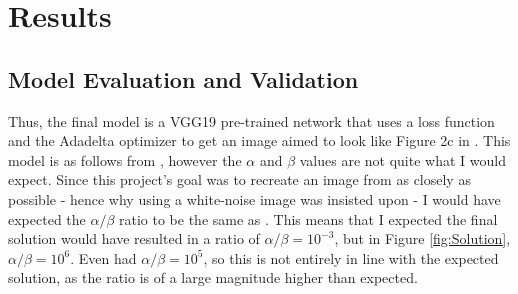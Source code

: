 \documentclass[12pt]{article}
\begin{document}
\section{Results}
\subsection{Model Evaluation and Validation}
Thus, the final model is a VGG19 pre-trained network that uses a loss function and the Adadelta optimizer to get an image aimed to look like Figure 2c in \cite{Neural}. This model is as follows from \cite{Neural, Image}, however the $\alpha$ and $\beta$ values are not quite what I would expect. Since this project's goal was to recreate an image from \cite{Neural} as closely as possible - hence why using a white-noise image was insisted upon - I would have expected the $\alpha/\beta$ ratio to be the same as \cite{Neural}. This means that I expected the final solution would have resulted in a ratio of $\alpha/\beta = 10^{-3}$, but in Figure \ref{fig:Solution}, $\alpha/\beta = 10^6$. Even \cite{Github} had $\alpha/\beta = 10^5$, so this is not entirely in line with the expected solution, as the ratio is of a large magnitude higher than expected. 
\end{document}
